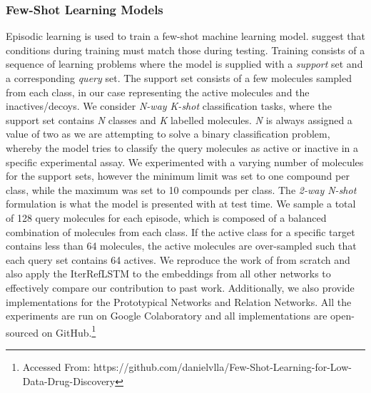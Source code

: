 \documentclass[journal=acscii,manuscript=article]{achemso}
\begin{document}
\subsubsection{Few-Shot Learning Models}

Episodic learning is used to train a few-shot machine learning model. \citet{vinyals2016matching} suggest that conditions during training must match those during testing. Training consists of a sequence of learning problems where the model is supplied with a \textit{support} set and a corresponding \textit{query} set. The support set consists of a few molecules sampled from each class, in our case representing the active molecules and the inactives/decoys. We consider \textit{N-way K-shot} classification tasks, where the support set contains \textit{N} classes and \textit{K} labelled molecules. \textit{N} is always assigned a value of two as we are attempting to solve a binary classification problem, whereby the model tries to classify the query molecules as active or inactive in a specific experimental assay. We experimented with a varying number of molecules for the support sets, however the minimum limit was set to one compound per class, while the maximum was set to 10 compounds per class. The \textit{2-way N-shot} formulation is what the model is presented with at test time. We sample a total of 128 query molecules for each episode, which is composed of a balanced combination of molecules from each class. If the active class for a specific target contains less than 64 molecules, the active molecules are over-sampled such that each query set contains 64 actives. We reproduce the work of \citet{altae2017low} from scratch and also apply the IterRefLSTM to the embeddings from all other networks to effectively compare our contribution to past work. Additionally, we also provide implementations for the Prototypical Networks and Relation Networks. All the experiments are run on Google Colaboratory and all implementations are open-sourced on GitHub.\footnote{Accessed From: https://github.com/danielvlla/Few-Shot-Learning-for-Low-Data-Drug-Discovery}

\end{document}
